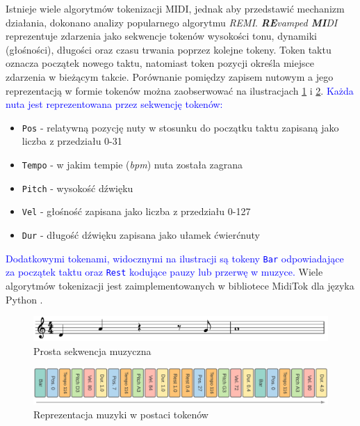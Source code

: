\documentclass[data-science]{agh-wi} %
\begin{document}
Istnieje wiele algorytmów tokenizacji MIDI, jednak aby przedstawić mechanizm działania, dokonano analizy popularnego algorytmu \textit{REMI}. \textit{\textbf{RE}vamped \textbf{MI}DI} reprezentuje zdarzenia jako sekwencje tokenów wysokości tonu, dynamiki (głośności), długości oraz czasu trwania poprzez kolejne tokeny. Token taktu oznacza początek nowego taktu, natomiast token pozycji określa miejsce zdarzenia w bieżącym takcie. Porównanie pomiędzy zapisem nutowym a jego reprezentacją w formie tokenów można zaobserwować na ilustracjach \ref*{fig:remi_notes} i \ref*{fig:remi_tokens}. \textcolor{blue}{Każda nuta jest reprezentowana przez sekwencję tokenów:}
\begin{itemize}
    \item \texttt{Pos} - relatywną pozycję nuty w stosunku do początku taktu zapisaną jako liczba z przedziału 0-31
    \item \texttt{Tempo} - w jakim tempie (\textit{bpm}) nuta została zagrana
    \item \texttt{Pitch} - wysokość dźwięku
    \item \texttt{Vel} - głośność zapisana jako liczba z przedziału 0-127
    \item \texttt{Dur} - długość dźwięku zapisana jako ułamek ćwierćnuty
\end{itemize}
\textcolor{blue}{Dodatkowymi tokenami, widocznymi na ilustracji są tokeny \texttt{Bar} odpowiadające za początek taktu oraz \texttt{Rest} kodujące pauzy lub przerwę w muzyce.} Wiele algorytmów tokenizacji jest zaimplementowanych w bibliotece MidiTok dla języka Python \cite{miditok2021}.

\begin{figure}[ht!]
    \begin{center}
        \includegraphics[width=0.9\linewidth]{./img/tokenizer_notes.pdf}
    \end{center}
    \caption{Prosta sekwencja muzyczna}\label{fig:remi_notes}
\end{figure}

\begin{figure}[ht!]
    \begin{center}
        \includegraphics[width=0.9\linewidth]{./img/remi.png}
    \end{center}
    \caption{Reprezentacja muzyki w postaci tokenów}\label{fig:remi_tokens}
\end{figure}
\end{document}

